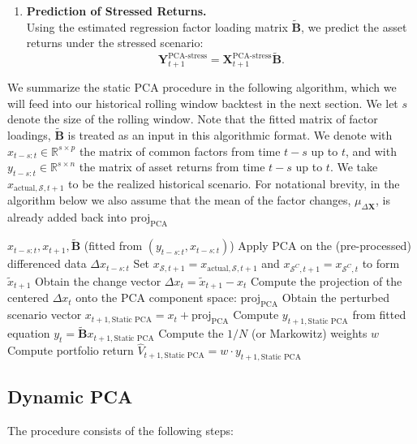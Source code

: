 \documentclass[11pt]{article}
\theoremstyle{plain}
\theoremstyle{definition}
\theoremstyle{remark}
\numberwithin{equation}{section}
\begin{document}
\begin{enumerate}
    \item \textbf{Prediction of Stressed Returns.} \\
    Using the estimated regression factor loading matrix $\tilde{\mathbf{B}}$, we predict the asset returns under the stressed scenario:
    \[
    \mathbf{Y}_{t+1}^{\text{PCA-stress}} = \mathbf{X}_{t+1}^{\text{PCA-stress}} \mathbf{\tilde{B}}.
    \]
    

\end{enumerate}

We summarize the static PCA procedure in the following algorithm, which we will feed into our historical rolling window backtest in the next section. We let $s$ denote the size of the rolling window. Note that the fitted matrix of factor loadings, $\mathbf{\tilde{B}}$ is treated as an input in this algorithmic format. We denote with $x_{t-s:t} \in \mathbb{R}^{s \times p}$ the matrix of common factors from time $t-s$ up to $t$, and with $y_{t-s:t} \in \mathbb{R}^{s \times n}$ the matrix of asset returns from time $t-s$ up to $t$. We take $x_{\mathrm{actual},\mathcal{S}, t+1}$ to be the realized historical scenario. For notational brevity, in the algorithm below we also assume that the mean of the factor changes, $\mu_{\Delta \mathbf{X}}$,  is already added back into $\text{proj}_{\text{PCA}}$

\begin{algorithm}[H]
\caption{Static PCA Portfolio Simulation} \label{alg:static_pca}
\begin{algorithmic}[1]
\Require $x_{t-s:t}, x_{t+1}, \mathbf{\tilde{B}}$ (fitted from $(y_{t-s:t}, x_{t-s:t})$)
\State Apply PCA on the (pre-processed) differenced data $\Delta x_{t-s:t}$
\State Set $x_{\mathcal{S},t+1}=x_{\mathrm{actual},\mathcal{S}, t+1}$ and $x_{\mathcal{S}^C,t+1}=x_{\mathcal{S}^C,t}$ to form $\tilde{x}_{t+1}$
\State Obtain the change vector $\Delta x_t=\tilde{x}_{t+1}-x_t$
\State Compute the projection of the centered $\Delta x_t$ onto the PCA component space: $\text{proj}_{\text{PCA}}$
\State Obtain the perturbed scenario vector $x_{t+1,\text{Static PCA}}=x_t+\text{proj}_{\text{PCA}}$
\State Compute $y_{t+1, \text{Static PCA}}$ from fitted equation $y_t = \mathbf{\tilde{B}} x_{t+1, \text{Static PCA}}$
\State Compute the $1/N$ (or Markowitz) weights $w$
\State Compute portfolio return $\hat{V}_{t+1, \text{Static PCA}}=w \cdot y_{t+1,\text{Static PCA}}$
\end{algorithmic}
\end{algorithm}

\subsection{Dynamic PCA}  
\label{app:dynamic_pca}
The procedure consists of the following steps:
\end{document}
